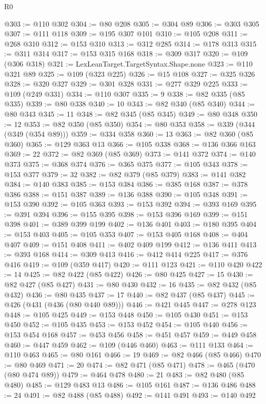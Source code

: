 \begin{lexlean}{R0}
\begin{coremodule}
@303 := @110 @302
@304 := @80 @208
@305 := @304 @89
@306 := @303 @305
@307 := @111 @118
@309 := @195 @307 @101
@310 := @105 @208
@311 := @268 @310
@312 := @153 @310
@313 := @312 @285
@314 := @178 @313
@315 := @311 @314
@317 := @153 @315 @168
@318 := @309 @317
@320 := @109 (@306 @318)
@321 := LexLeanTarget.TargetSyntax.Shape.none
@323 := @110 @321 @89
@325 := @109 (@323 @225)
@326 := @15 @108
@327 := @325 @326
@328 := @320 @327
@329 := @301 @328
@331 := @277 @329 @225
@333 := @109 (@249 @331)
@334 := @110 @307
@335 := 9
@338 := @82 @335 (@85 @335)
@339 := @80 @338
@340 := 10
@343 := @82 @340 (@85 @340)
@344 := @80 @343
@345 := 11
@348 := @82 @345 (@85 @345)
@349 := @80 @348
@350 := 12
@353 := @82 @350 (@85 @350)
@354 := @80 @353
@358 := @339 (@344 (@349 (@354 @89)))
@359 := @334 @358
@360 := 13
@363 := @82 @360 (@85 @360)
@365 := @129 @363 @13
@366 := @105 @338
@368 := @136 @366 @163
@369 := 22
@372 := @82 @369 (@85 @369)
@373 := @141 @372
@374 := @140 @373
@375 := @368 @374
@376 := @365 @375
@377 := @105 @343
@378 := @153 @377
@379 := 32
@382 := @82 @379 (@85 @379)
@383 := @141 @382
@384 := @140 @383
@385 := @153 @384
@386 := @385 @168
@387 := @378 @386
@388 := @151 @387
@389 := @136 @388
@390 := @105 @348
@391 := @153 @390
@392 := @105 @363
@393 := @153 @392
@394 := @393 @169
@395 := @391 @394
@396 := @155 @395
@398 := @153 @396 @169
@399 := @151 @398
@401 := @389 @399 @199
@402 := @136 @401
@403 := @180 @395
@404 := @153 @403
@405 := @105 @353
@407 := @153 @405 @168
@408 := @404 @407
@409 := @151 @408
@411 := @402 @409 @199
@412 := @136 @411
@413 := @393 @168
@414 := @309 @413
@416 := @412 @414 @225
@417 := @376 @416
@419 := @109 (@359 @417)
@420 := @111 @123
@421 := @110 @420
@422 := 14
@425 := @82 @422 (@85 @422)
@426 := @80 @425
@427 := 15
@430 := @82 @427 (@85 @427)
@431 := @80 @430
@432 := 16
@435 := @82 @432 (@85 @432)
@436 := @80 @435
@437 := 17
@440 := @82 @437 (@85 @437)
@445 := @426 (@431 (@436 (@80 @440 @89)))
@446 := @421 @445
@447 := @278 @123
@448 := @105 @425
@449 := @153 @448
@450 := @105 @430
@451 := @153 @450
@452 := @105 @435
@453 := @153 @452
@454 := @105 @440
@456 := @153 @454 @168
@457 := @453 @456
@458 := @451 @457
@459 := @449 @458
@460 := @447 @459
@462 := @109 (@446 @460)
@463 := @111 @133
@464 := @110 @463
@465 := @80 @161
@466 := 19
@469 := @82 @466 (@85 @466)
@470 := @80 @469
@471 := 20
@474 := @82 @471 (@85 @471)
@478 := @465 (@470 (@80 @474 @89))
@479 := @464 @478
@480 := 21
@483 := @82 @480 (@85 @480)
@485 := @129 @483 @13
@486 := @105 @161
@487 := @136 @486
@488 := 24
@491 := @82 @488 (@85 @488)
@492 := @141 @491
@493 := @140 @492

\end{coremodule}
\end{lexlean}
